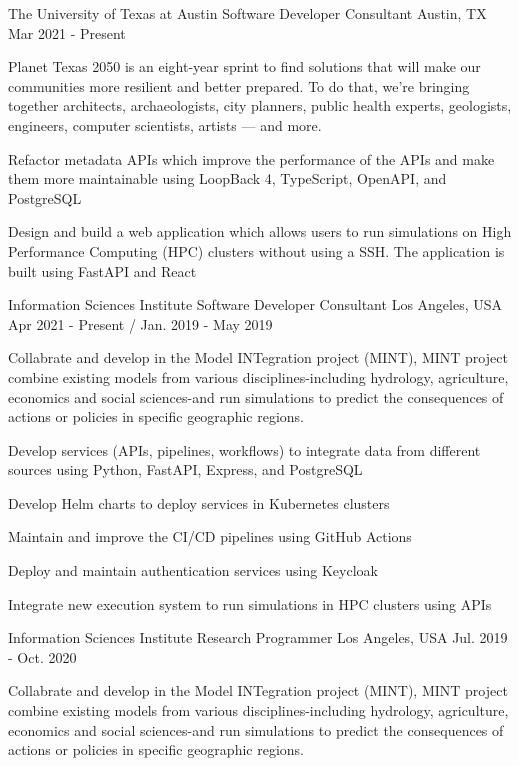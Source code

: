 \begin{cventries}

  \cventry
    {The University of Texas at Austin}
    {Software Developer Consultant}
    {Austin, TX}
    {Mar 2021 - Present}
    {
      \begin{cvitems}
        \item{Planet Texas 2050 is an eight-year sprint to find solutions that will make our communities more resilient and better prepared. To do that, we’re bringing together architects, archaeologists, city planners, public health experts, geologists, engineers, computer scientists, artists — and more.}
        \item{Refactor metadata APIs which improve the performance of the APIs and make them more maintainable using LoopBack 4, TypeScript, OpenAPI, and PostgreSQL}
        \item{Design and build a web application which allows users to run simulations on High Performance Computing (HPC) clusters without using a SSH. The application is built using FastAPI and React}
      \end{cvitems}
    }

  \cventry
    {Information Sciences Institute}
    {Software Developer Consultant}
    {Los Angeles, USA}
    {Apr 2021 - Present / Jan. 2019 - May 2019}
    {
      \begin{cvitems}
        \item{Collabrate and develop in the Model INTegration project (MINT), MINT project combine existing models from various disciplines-including hydrology, agriculture, economics and social sciences-and run simulations to predict the consequences of actions or policies in specific geographic regions.}
        \item {Develop services (APIs, pipelines, workflows) to integrate data from different sources using Python, FastAPI, Express, and PostgreSQL}
        \item {Develop Helm charts to deploy services in Kubernetes clusters}
        \item {Maintain and improve the CI/CD pipelines using GitHub Actions}
        \item {Deploy and maintain authentication services using Keycloak}
        \item {Integrate new execution system to run simulations in HPC clusters using APIs}
      \end{cvitems}
    }

  \cventry
    {Information Sciences Institute}
    {Research Programmer}
    {Los Angeles, USA}
    {Jul. 2019 - Oct. 2020}
    {
      \begin{cvitems}
        \item{Collabrate and develop in the Model INTegration project (MINT), MINT project combine existing models from various disciplines-including hydrology, agriculture, economics and social sciences-and run simulations to predict the consequences of actions or policies in specific geographic regions.}
      \end{cvitems}
    }


\end{cventries}
